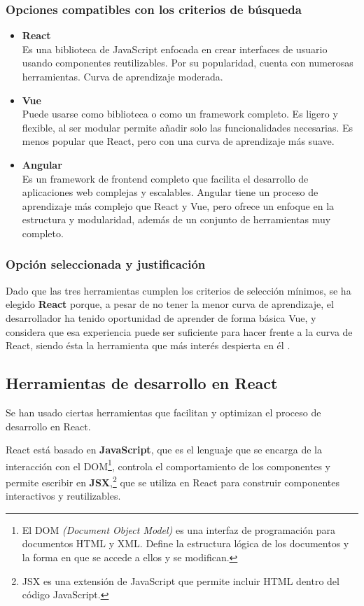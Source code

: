 \subsubsection{Opciones compatibles con los criterios de búsqueda}
\begin{itemize}
    \item \textbf{React}\\
        Es una biblioteca de JavaScript enfocada en crear interfaces de usuario usando componentes reutilizables. Por su popularidad, cuenta con numerosas herramientas. Curva de aprendizaje moderada.
    \item \textbf{Vue}\\
        Puede usarse como biblioteca o como un framework completo. Es ligero y flexible, al ser modular permite añadir solo las funcionalidades necesarias. Es menos popular que React, pero con una curva de aprendizaje más suave.
    \item \textbf{Angular}\\
        Es un framework de frontend completo que facilita el desarrollo de aplicaciones web complejas y escalables. Angular tiene un proceso de aprendizaje más complejo que React y Vue, pero ofrece un enfoque en la estructura y modularidad, además de un conjunto de herramientas muy completo.
\end{itemize}

\subsubsection{Opción seleccionada y justificación}
Dado que las tres herramientas cumplen los criterios de selección mínimos, se ha elegido \textbf{React} porque, a pesar de no tener la menor curva de aprendizaje, el desarrollador ha tenido oportunidad de aprender de forma básica Vue, y considera que esa experiencia puede ser suficiente para hacer frente a la curva de React, siendo ésta la herramienta que más interés despierta en él \cite{banks2020learning}\cite{holasoymalva_react_angular_vue}.

\subsection{Herramientas de desarrollo en React}
Se han usado ciertas herramientas que facilitan y optimizan el proceso de desarrollo en React.

React está basado en \textbf{JavaScript}, que es el lenguaje que se encarga de la interacción con el DOM\footnote{ El DOM \textit{(Document Object Model)} es una interfaz de programación para documentos HTML y XML. Define la estructura lógica de los documentos y la forma en que se accede a ellos y se modifican.}, controla el comportamiento de los componentes y permite escribir en \textbf{JSX},\footnote{JSX es una extensión de JavaScript que permite incluir HTML dentro del código JavaScript.} que se utiliza en React para construir componentes interactivos y reutilizables.


